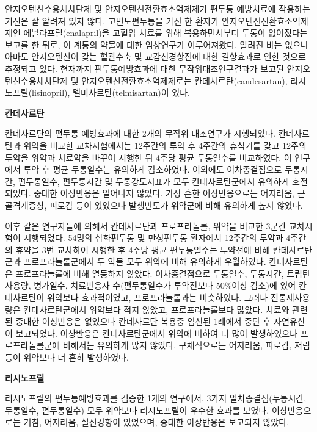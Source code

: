 \documentclass[]{book}
\begin{document}
안지오텐신수용체차단제 및 안지오텐신전환효소억제제가 편두통 예방치료에 작용하는 기전은 잘 알려져 있지 않다. 고빈도편두통을 가진 한 환자가 안지오텐신전환효소억제제인 에날라프릴(enalapril)을 고혈압 치료를 위해 복용하면서부터 두통이 없어졌다는 보고를 한 뒤로, 이 계통의 약물에 대한 임상연구가 이루어져왔다. 알려진 바는 없으나 아마도 안지오텐신이 갖는 혈관수축 및 교감신경항진에 대한 길항효과로 인한 것으로 추정되고 있다. 현재까지 편두통예방효과에 대한 무작위대조연구결과가 보고된 안지오텐신수용체차단제 및 안지오텐신전환효소억제제로는 칸데사르탄(candesartan), 리시노프릴(lisinopril), 텔미사르탄(telmisartan)이 있다.

\textbf{칸데사르탄}

칸데사르탄의 편두통 예방효과에 대한 2개의 무작위 대조연구가 시행되었다. 칸데사르탄과 위약을 비교한 교차시험에서는 12주간의 투약 후 4주간의 휴식기를 갖고 12주의 투약을 위약과 치료약을 바꾸어 시행한 뒤 4주당 평균 두통일수를 비교하였다. 이 연구에서 투약 후 평균 두통일수는 유의하게 감소하였다. 이외에도 이차종결점으로 두통시간, 편두통일수, 편두통시간 및 두통강도지표가 모두 칸데사르탄군에서 유의하게 호전되었다. 중대한 이상반응은 일어나지 않았다. 가장 흔한 이상반응으로는 어지러움, 근골격계증상, 피로감 등이 있었으나 발생빈도가 위약군에 비해 유의하게 높지 않았다.

이후 같은 연구자들에 의해서 칸데사르탄과 프로프라놀롤, 위약을 비교한 3군간 교차시험이 시행되었다. 54명의 삽화편두통 및 만성편두통 환자에서 12주간의 투약과 4주간의 휴약을 3번 교차하여 시행한 후 4주당 평균 편두통일수는 투약전에 비해 칸데사르탄군과 프로프라놀롤군에서 두 약물 모두 위약에 비해 유의하게 우월하였다. 칸데사르탄은 프로프라놀롤에 비해 열등하지 않았다. 이차종결점으로 두통일수, 두통시간, 트립탄사용량, 병가일수, 치료반응자 수(편두통일수가 투약전보다 50\%이상 감소)에 있어 칸데사르탄이 위약보다 효과적이었고, 프로프라놀롤과는 비슷하였다. 그러나 진통제사용량은 칸데사르탄군에서 위약보다 적지 않았고, 프로프라놀롤보다 많았다. 치료와 관련된 중대한 이상반응은 없었으나 칸데사르탄 복용중 임신된 1례에서 중단 후 자연유산이 보고되었다. 이상반응은 칸데사르탄군에서 위약에 비하여 더 많이 발생하였으나 프로프라놀롤군에 비해서는 유의하게 많지 않았다. 구체적으로는 어지러움, 피로감, 저림 등이 위약보다 더 흔히 발생하였다.

\textbf{리시노프릴}

리시노프릴의 편두통예방효과를 검증한 1개의 연구에서, 3가지 일차종결점(두통시간, 두통일수, 편두통일수) 모두 위약보다 리시노프릴이 우수한 효과를 보였다. 이상반응으로는 기침, 어지러움, 실신경향이 있었으며, 중대한 이상반응은 보고되지 않았다.
\end{document}
